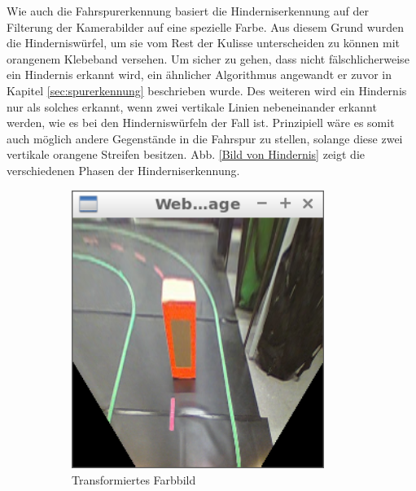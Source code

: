 Wie auch die Fahrspurerkennung basiert die Hinderniserkennung auf der Filterung der Kamerabilder auf eine spezielle Farbe. Aus diesem Grund wurden die Hinderniswürfel, um sie vom Rest der Kulisse unterscheiden zu können mit orangenem Klebeband versehen. Um sicher zu gehen, dass nicht fälschlicherweise ein Hindernis erkannt wird, ein ähnlicher Algorithmus angewandt er zuvor in Kapitel \ref{sec:spurerkennung} beschrieben wurde. Des weiteren wird ein Hindernis nur als solches erkannt, wenn zwei vertikale Linien nebeneinander erkannt werden, wie es bei den Hinderniswürfeln der Fall ist. Prinzipiell wäre es somit auch möglich andere Gegenstände in die Fahrspur zu stellen, solange diese zwei vertikale orangene Streifen besitzen. Abb. \ref{Bild von Hindernis} zeigt die verschiedenen Phasen der Hinderniserkennung.

\begin{figure}
	\centering
	\begin{subfigure}{0.45\textwidth}
		\centering
		\includegraphics[width=0.9\textwidth]{images/obstacle_original.png}
		\caption{Transformiertes Farbbild}
	\end{subfigure}
	\begin{subfigure}{0.45\textwidth}
		\centering

\end{subfigure}
\end{figure}
